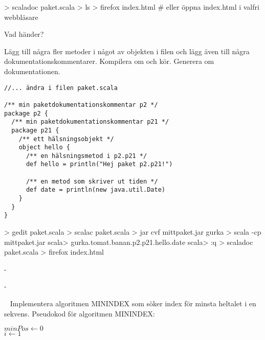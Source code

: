 \begin{REPL}
> scaladoc paket.scala
> ls
> firefox index.html   # eller öppna index.html i valfri webbläsare
\end{REPL}

Vad händer?

\Subtask Lägg till några fler metoder i något av objekten i filen  och lägg även till några dokumentationskommentarer. Kompilera om och kör. Generera om dokumentationen.

\begin{verbatim}
//... ändra i filen paket.scala

/** min paketdokumentationskommentar p2 */
package p2 {
  /** min paketdokumentationskommentar p21 */
  package p21 {
    /** ett hälsningsobjekt */
    object hello {
      /** en hälsningsmetod i p2.p21 */
      def hello = println("Hej paket p2.p21!")

      /** en metod som skriver ut tiden */
      def date = println(new java.util.Date)
    }
  }
}

\end{verbatim}

\begin{REPL}
> gedit paket.scala
> scalac paket.scala
> jar cvf mittpaket.jar gurka
> scala -cp mittpaket.jar
scala> gurka.tomat.banan.p2.p21.hello.date
scala> :q
> scaladoc paket.scala
> firefox index.html
\end{REPL}

\newpage

\ExtraTasks %

\SOLUTION


\TaskSolved \what
 

\SubtaskSolved  -

\SubtaskSolved  -
\QUESTEND







\QUESTBEGIN

\Task \label{task:minindex} \what~  Implementera algoritmen MININDEX som söker index för minsta heltalet i en sekvens. Pseudokod för algoritmen MININDEX:

\begin{algorithm}[H]

 $minPos \leftarrow 0 $\\
 $i \leftarrow 1$ \\
\end{algorithm}

